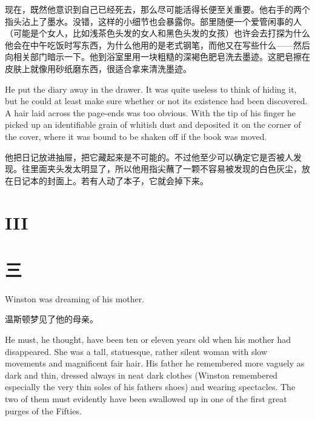 \begin{paracol}{2}
\switchcolumn

现在，既然他意识到自己已经死去，那么尽可能活得长便至关重要。他右手的两个指头沾上了墨水。没错，这样的小细节也会暴露你。部里随便一个爱管闲事的人（可能是个女人，比如浅茶色头发的女人和黑色头发的女孩）也许会去打探为什么他会在中午吃饭时写东西，为什么他用的是老式钢笔，而他又在写些什么——然后向相关部门暗示一下。他到浴室里用一块粗糙的深褐色肥皂洗去墨迹。这肥皂擦在皮肤上就像用砂纸磨东西，很适合拿来清洗墨迹。

\switchcolumn*

He put the diary away in the drawer. It was quite useless to think of
hiding it, but he could at least make sure whether or not its existence
had been discovered. A hair laid across the page-ends was too obvious.
With the tip of his finger he picked up an identifiable grain of whitish
dust and deposited it on the corner of the cover, where it was bound to
be shaken off if the book was moved.

\switchcolumn

他把日记放进抽屉，把它藏起来是不可能的。不过他至少可以确定它是否被人发现。往里面夹头发太明显了，所以他用指尖蘸了一颗不容易被发现的白色灰尘，放在日记本的封面上。若有人动了本子，它就会掉下来。

\switchcolumn*


\section{III}\label{iii}

\switchcolumn

\section*{三}\label{ux4e09}

\switchcolumn*

Winston was dreaming of his mother.

\switchcolumn

温斯顿梦见了他的母亲。

\switchcolumn*

He must, he thought, have been ten or eleven years old when his mother
had disappeared. She was a tall, statuesque, rather silent woman with
slow movements and magnificent fair hair. His father he remembered more
vaguely as dark and thin, dressed always in neat dark clothes (Winston
remembered especially the very thin soles of his
father\textquotesingle s shoes) and wearing spectacles. The two of them
must evidently have been swallowed up in one of the first great purges
of the Fifties.


\end{paracol}
